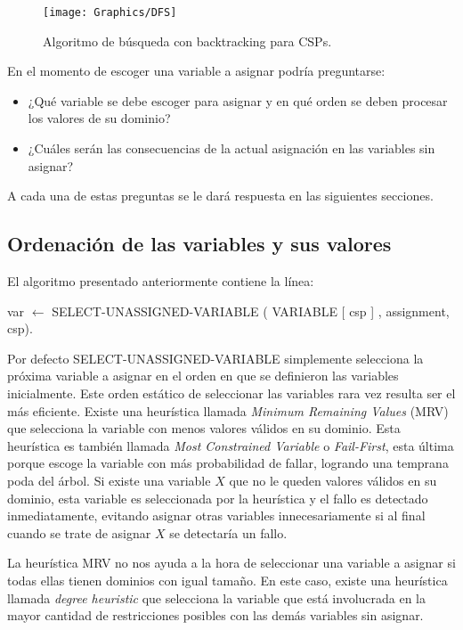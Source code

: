 \begin{figure}
	\begin{center}
		\texttt{[image: Graphics/DFS]}
		\caption{Algoritmo de b\'usqueda con backtracking para CSPs.}
		\label{DFS}
	\end{center}	
\end{figure}

En el momento de escoger una variable a asignar podr\'ia preguntarse:

\begin{itemize}
	\item ¿Qu\'e variable se debe escoger para asignar y en qu\'e orden se deben procesar los valores de su dominio?
	\item ¿Cu\'ales ser\'an las consecuencias de la actual asignaci\'on en las variables sin asignar?
\end{itemize}

A cada una de estas preguntas se le dar\'a respuesta en las siguientes secciones.

\subsection{Ordenaci\'on de las variables y sus valores}

El algoritmo presentado anteriormente contiene la línea:

\begin{center}
	\scriptsize var $\leftarrow$ SELECT-UNASSIGNED-VARIABLE ( VARIABLE [ csp ] , assignment, csp).
\end{center}

Por defecto SELECT-UNASSIGNED-VARIABLE simplemente selecciona la pr\'oxima variable a asignar en el orden en que se definieron las variables inicialmente. Este orden est\'atico de seleccionar las variables rara vez resulta ser el m\'as eficiente. Existe una heur\'istica llamada \emph{Minimum Remaining Values} (MRV) que selecciona la variable con menos valores v\'alidos en su dominio. Esta heur\'istica es tambi\'en llamada \emph{Most Constrained Variable} o \emph{Fail-First}, esta \'ultima porque escoge la variable con m\'as probabilidad de fallar, logrando una temprana poda del \'arbol. Si existe una variable $X$ que no le queden valores v\'alidos en su dominio, esta variable es seleccionada por la heur\'istica y el fallo es detectado inmediatamente, evitando asignar otras variables innecesariamente si al final cuando se trate de asignar $X$ se detectar\'ia un fallo.

La heur\'istica MRV no nos ayuda a la hora de seleccionar una variable a asignar si todas ellas tienen dominios con igual tamaño. En este caso, existe una heur\'istica llamada \emph{degree heuristic} que selecciona la variable que est\'a involucrada en la mayor cantidad de restricciones posibles con las dem\'as variables sin asignar.

